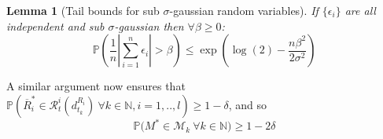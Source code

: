 \documentclass{article}
\newtheorem{lemma}{Lemma}
\newcommand{\Prob}{\mathds{P}}
\newcommand{\Nat}{\mathbb{N}}
\newcommand{\Xc}{\mathcal{X}}
\newcommand{\Rc}{\mathcal{R}}
\newcommand{\Mc}{\mathcal{M}}
\begin{document}
\begin{lemma}[Tail bounds for sub $\sigma$-gaussian random variables] 
\label{lem: tail}
\hspace{0.000000001mm} \newline
If $\{ \epsilon_i \}$ are all independent and sub $\sigma$-gaussian then $\forall \beta \ge 0$:
$$\Prob \left( \frac{1}{n} | \sum_{i=1}^n \epsilon_i | > \beta \right) \le \exp\left( \log(2) -\frac{n \beta^2}{2 \sigma^2} \right) $$
\end{lemma}
A similar argument now ensures that
$\Prob \left( \overline{R}^*_i \in \Rc^i_t(d_{t_k}^{R_i}) \ \forall k \in \Nat,i=1,..,l  \right) \ge 1 - \delta $, and so
\begin{equation}
\label{eq: conf}
	\Prob \bigg( M^*\in \Mc_k \ \forall k \in \Nat  \bigg) \ge 1 - 2\delta	
\end{equation}

\end{document}
